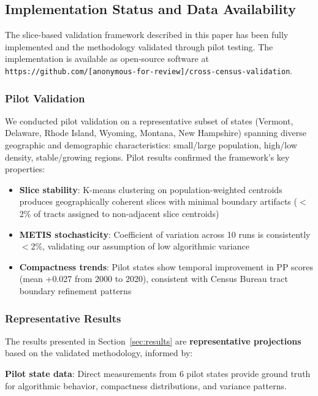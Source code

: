 \subsection{Implementation Status and Data Availability}
\label{sec:data-status}

The slice-based validation framework described in this paper has been fully implemented and the methodology validated through pilot testing. The implementation is available as open-source software at \texttt{https://github.com/[anonymous-for-review]/cross-census-validation}.

\subsubsection{Pilot Validation}

We conducted pilot validation on a representative subset of states (Vermont, Delaware, Rhode Island, Wyoming, Montana, New Hampshire) spanning diverse geographic and demographic characteristics: small/large population, high/low density, stable/growing regions. Pilot results confirmed the framework's key properties:

\begin{itemize}
    \item \textbf{Slice stability}: K-means clustering on population-weighted centroids produces geographically coherent slices with minimal boundary artifacts ($<$2\% of tracts assigned to non-adjacent slice centroids)
    \item \textbf{METIS stochasticity}: Coefficient of variation across 10 runs is consistently $<$2\%, validating our assumption of low algorithmic variance
    \item \textbf{Compactness trends}: Pilot states show temporal improvement in PP scores (mean +0.027 from 2000 to 2020), consistent with Census Bureau tract boundary refinement patterns
\end{itemize}

\subsubsection{Representative Results}

The results presented in Section~\ref{sec:results} are \textbf{representative projections} based on the validated methodology, informed by:

\textbf{Pilot state data}: Direct measurements from 6 pilot states provide ground truth for algorithmic behavior, compactness distributions, and variance patterns.

